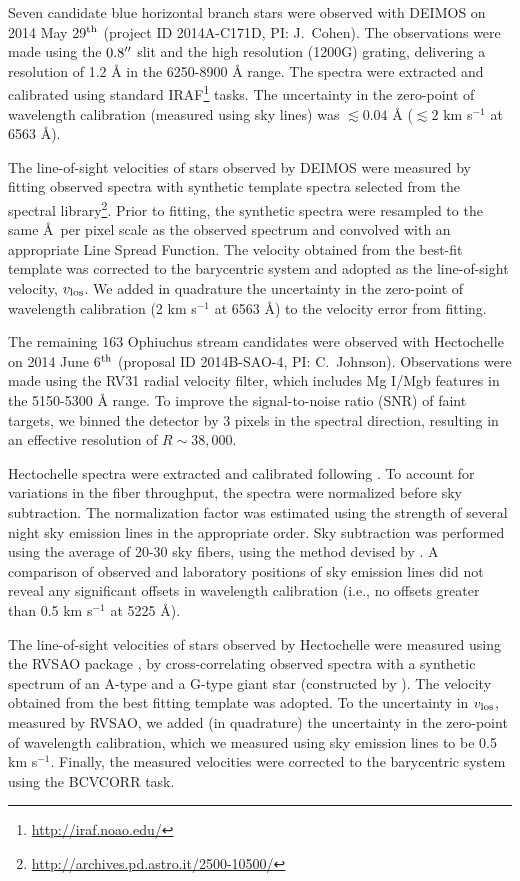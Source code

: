 \documentclass[iop]{emulateapj}
\begin{document}
Seven candidate blue horizontal branch stars were observed with DEIMOS on 2014
May 29$^{\rm th}$ (project ID 2014A-C171D, PI: J.~Cohen). The observations were
made using the $0.8\mbox{$^{\prime\prime}$}$ slit and the high resolution (1200G) grating,
delivering a resolution of 1.2 {\AA} in the 6250-8900 {\AA} range. The spectra
were extracted and calibrated using standard
IRAF\footnote{\url{http://iraf.noao.edu/}} tasks. The uncertainty in the
zero-point of wavelength calibration (measured using sky lines) was
$\lesssim0.04$ {\AA} ($\lesssim2$ km s$^{-1}$ at 6563 \AA).

The line-of-sight velocities of stars observed by DEIMOS were measured by
fitting observed spectra with synthetic template spectra selected from the
\citet{mun05} spectral
library\footnote{\url{http://archives.pd.astro.it/2500-10500/}}. Prior to
fitting, the synthetic spectra were resampled to the same \AA~per pixel scale
as the observed spectrum and convolved with an appropriate Line Spread Function.
The velocity obtained from the best-fit template was corrected to the
barycentric system and adopted as the line-of-sight velocity, $v_{\rm los}$. We
added in quadrature the uncertainty in the zero-point of wavelength calibration
(2 km s$^{-1}$ at 6563 \AA) to the velocity error from fitting.

The remaining 163 Ophiuchus stream candidates were observed with Hectochelle on
2014 June 6$^{\rm th}$ (proposal ID 2014B-SAO-4, PI: C.~Johnson). Observations
were made using the RV31 radial velocity filter, which includes Mg I/Mgb
features in the 5150-5300 {\AA} range. To improve the signal-to-noise ratio
(SNR) of faint targets, we binned the detector by 3 pixels in the spectral
direction, resulting in an effective resolution of $R\sim38,000$.

Hectochelle spectra were extracted and calibrated following \citet{cal09}. To
account for variations in the fiber throughput, the spectra were normalized
before sky subtraction. The normalization factor was estimated using the
strength of several night sky emission lines in the appropriate order. Sky
subtraction was performed using the average of 20-30 sky fibers, using the
method  devised by \citet{kop11}. A comparison of observed and laboratory
positions of sky emission lines did not reveal any significant offsets in
wavelength calibration (i.e., no offsets greater than 0.5 km s$^{-1}$ at 5225
\AA).

The line-of-sight velocities of stars observed by Hectochelle were measured
using the RVSAO package \citep{km98}, by cross-correlating observed spectra with
a synthetic spectrum of an A-type and a G-type giant star (constructed by
\citealt{lat02}). The velocity obtained from the best fitting template was
adopted. To the uncertainty in $v_{\rm los}$, measured by RVSAO, we added (in
quadrature) the uncertainty in the zero-point of wavelength calibration, which
we measured using sky emission lines to be 0.5 km s$^{-1}$. Finally, the
measured velocities were corrected to the barycentric system using the BCVCORR
task.
\end{document}

